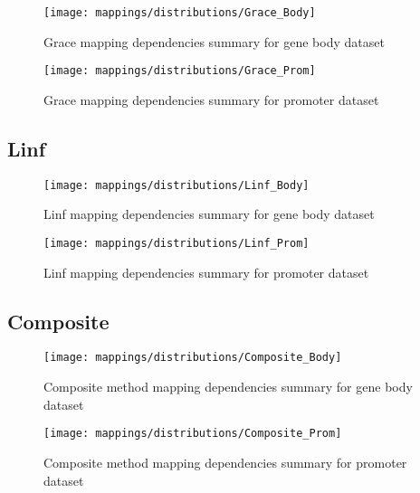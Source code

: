 \begin{figure}[H]
	\centering
	\texttt{[image: mappings/distributions/Grace\_Body]}
	\caption{Grace mapping dependencies summary for gene body dataset}
	\label{fig:map_body_grace}
\end{figure}

\begin{figure}[H]
	\centering
	\texttt{[image: mappings/distributions/Grace\_Prom]}
	\caption{Grace mapping dependencies summary for promoter dataset}
	\label{fig:map_prom_grace}
\end{figure}


\pagebreak
\subsection{Linf}

\begin{figure}[H]
	\centering
	\texttt{[image: mappings/distributions/Linf\_Body]}
	\caption{Linf mapping dependencies summary for gene body dataset}
	\label{fig:map_body_linf}
\end{figure}

\begin{figure}[H]
	\centering
	\texttt{[image: mappings/distributions/Linf\_Prom]}
	\caption{Linf mapping dependencies summary for promoter dataset}
	\label{fig:map_prom_linf}
\end{figure}


\pagebreak
\subsection{Composite}

\begin{figure}[H]
	\centering
	\texttt{[image: mappings/distributions/Composite\_Body]}
	\caption{Composite method mapping dependencies summary for gene body dataset}
	\label{fig:map_body_comp}
\end{figure}

\begin{figure}[H]
	\centering
	\texttt{[image: mappings/distributions/Composite\_Prom]}
	\caption{Composite method mapping dependencies summary for promoter dataset}
	\label{fig:map_prom_comp}
\end{figure}